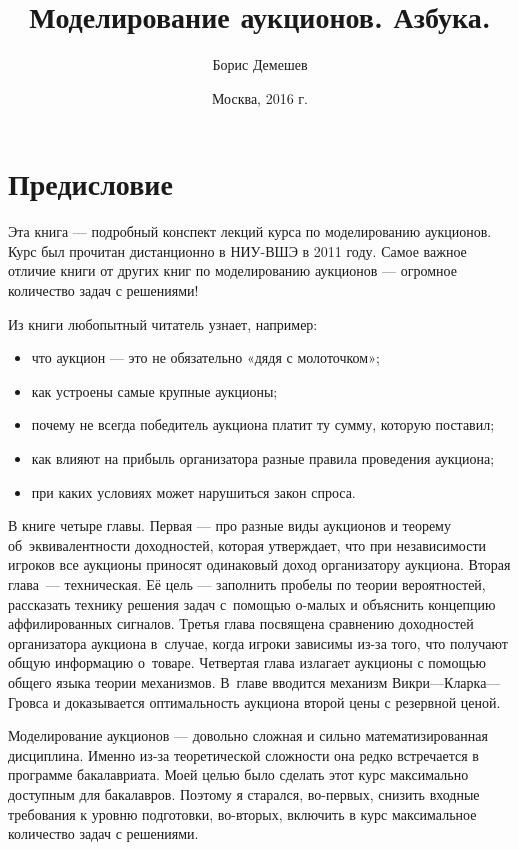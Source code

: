 \documentclass[11pt, openany]{book}
\title{Моделирование аукционов. Азбука. }
\author{Борис Демешев}
\date{Москва, 2016 г.}
\numberwithin{equation}{page} %
\theoremstyle{definition} %
\theoremstyle{definition}
\theoremstyle{definition}
\begin{document}
\maketitle

\setcounter{page}{3}

\tableofcontents{}

\chapter*{Предисловие}

Эта книга — подробный конспект лекций курса по моделированию аукционов. Курс был прочитан дистанционно в НИУ-ВШЭ в 2011 году. Самое важное отличие книги от других книг по моделированию аукционов — огромное количество задач с решениями!

Из книги любопытный читатель узнает, например:
\begin{itemize}
\item что аукцион — это не обязательно «дядя с молоточком»;
\item как устроены самые крупные аукционы;
\item почему не всегда победитель аукциона платит ту сумму, которую поставил;
\item как влияют на прибыль организатора разные правила проведения аукциона;
\item при каких условиях может нарушиться закон спроса.
\end{itemize}

В книге четыре главы. Первая — про разные виды аукционов и теорему об~эквивалентности доходностей, которая утверждает, что при независимости игроков все аукционы приносят одинаковый доход организатору аукциона. Вторая глава~— техническая. Её цель — заполнить пробелы по теории вероятностей, рассказать технику решения задач с~помощью о-малых и объяснить концепцию аффилированных сигналов. Третья глава посвящена сравнению доходностей организатора аукциона в~случае, когда игроки зависимы из-за того, что получают общую информацию о~товаре. Четвертая глава излагает аукционы с помощью общего языка теории механизмов. В~главе вводится механизм Викри—Кларка—Гровса и доказывается оптимальность аукциона второй цены с резервной ценой.

Моделирование аукционов — довольно сложная и сильно математизированная дисциплина. Именно из-за теоретической сложности она редко встречается в программе бакалавриата. Моей целью было сделать этот курс максимально доступным для бакалавров. Поэтому я старался, во-первых, снизить входные требования к уровню подготовки, во-вторых, включить в курс максимальное количество задач с решениями.
\end{document}
